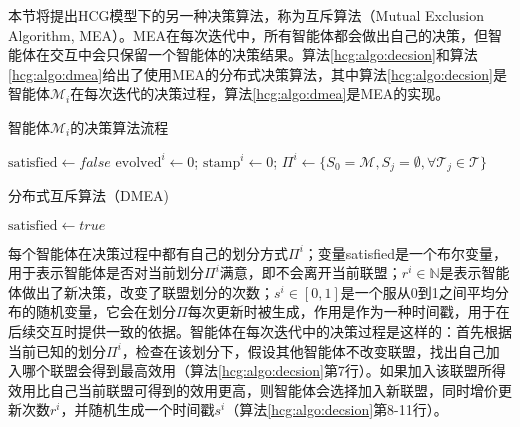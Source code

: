 本节将提出HCG模型下的另一种决策算法，称为互斥算法（Mutual Exclusion Algorithm, MEA）。MEA在每次迭代中，所有智能体都会做出自己的决策，但智能体在交互中会只保留一个智能体的决策结果。算法\ref{hcg:algo:decsion}和算法\ref{hcg:algo:dmea}给出了使用MEA的分布式决策算法，其中算法\ref{hcg:algo:decsion}是智能体$\mathcal{M}_i$在每次迭代的决策过程，算法\ref{hcg:algo:dmea}是MEA的实现。

\begin{algorithm}[htb]
	\caption{智能体$\mathcal{M}_i$的决策算法流程}
	\label{hcg:algo:decsion}
	\small
	\SetAlgoLined
	$\text{satisfied} \gets false$\;
	$\text{evolved}^i\gets 0$;
	$\text{stamp}^i \gets 0$;
	$\Pi^i \gets \{S_0=\mathcal{M},S_j=\emptyset, \forall \mathcal{T}_j \in \mathcal{T} \}$\;
	
\end{algorithm}

\begin{algorithm}[htb]
	\caption{分布式互斥算法（DMEA)}
	\label{hcg:algo:dmea}
	\small
	\SetAlgoLined
	$\text{satisfied} \gets true$\;
\end{algorithm}

每个智能体在决策过程中都有自己的划分方式$\Pi^i$；变量satisfied是一个布尔变量，用于表示智能体是否对当前划分$\Pi^i$满意，即不会离开当前联盟；$r^i \in \mathbb{N}$是表示智能体做出了新决策，改变了联盟划分的次数；$s^i \in [0,1]$是一个服从0到1之间平均分布的随机变量，它会在划分$\Pi$每次更新时被生成，作用是作为一种时间戳，用于在后续交互时提供一致的依据。智能体在每次迭代中的决策过程是这样的：首先根据当前已知的划分$\Pi^i$，检查在该划分下，假设其他智能体不改变联盟，找出自己加入哪个联盟会得到最高效用（算法\ref{hcg:algo:decsion}第7行）。如果加入该联盟所得效用比自己当前联盟可得到的效用更高，则智能体会选择加入新联盟，同时增价更新次数$r^i$，并随机生成一个时间戳$s^i$（算法\ref{hcg:algo:decsion}第8-11行）。

